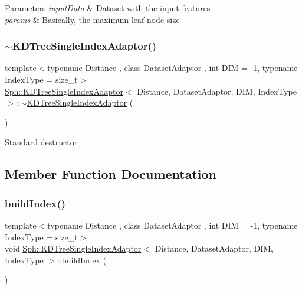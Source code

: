 \begin{DoxyParams}{Parameters}
{\em input\+Data} & Dataset with the input features \\
\hline
{\em params} & Basically, the maximum leaf node size \\
\hline
\end{DoxyParams}
\hypertarget{classSph_1_1KDTreeSingleIndexAdaptor_a809ad0ae1a688dd8f9870236a3157788}{}\label{classSph_1_1KDTreeSingleIndexAdaptor_a809ad0ae1a688dd8f9870236a3157788} 
\subsubsection{\texorpdfstring{$\sim$\+K\+D\+Tree\+Single\+Index\+Adaptor()}{~KDTreeSingleIndexAdaptor()}}
{\footnotesize\ttfamily template$<$typename Distance , class Dataset\+Adaptor , int D\+IM = -\/1, typename Index\+Type  = size\+\_\+t$>$ \\
\hyperlink{classSph_1_1KDTreeSingleIndexAdaptor}{Sph\+::\+K\+D\+Tree\+Single\+Index\+Adaptor}$<$ Distance, Dataset\+Adaptor, D\+IM, Index\+Type $>$\+::$\sim$\hyperlink{classSph_1_1KDTreeSingleIndexAdaptor}{K\+D\+Tree\+Single\+Index\+Adaptor} (\begin{DoxyParamCaption}{ }\end{DoxyParamCaption})\hspace{0.3cm}{\ttfamily [inline]}}

Standard destructor 

\subsection{Member Function Documentation}
\hypertarget{classSph_1_1KDTreeSingleIndexAdaptor_a9806520fd7f6a35557d4c52043459358}{}\label{classSph_1_1KDTreeSingleIndexAdaptor_a9806520fd7f6a35557d4c52043459358} 
\subsubsection{\texorpdfstring{build\+Index()}{buildIndex()}}
{\footnotesize\ttfamily template$<$typename Distance , class Dataset\+Adaptor , int D\+IM = -\/1, typename Index\+Type  = size\+\_\+t$>$ \\
void \hyperlink{classSph_1_1KDTreeSingleIndexAdaptor}{Sph\+::\+K\+D\+Tree\+Single\+Index\+Adaptor}$<$ Distance, Dataset\+Adaptor, D\+IM, Index\+Type $>$\+::build\+Index (\begin{DoxyParamCaption}{ }\end{DoxyParamCaption})\hspace{0.3cm}{\ttfamily [inline]}}

